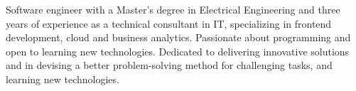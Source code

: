 

\begin{cvparagraph}

Software engineer with a Master's degree in Electrical Engineering and three years of experience as a technical consultant in IT, specializing in frontend development, cloud and business analytics. Passionate about programming and open to learning new technologies. Dedicated to delivering innovative solutions and in devising a better problem-solving method for challenging tasks, and learning new technologies.
\end{cvparagraph}
